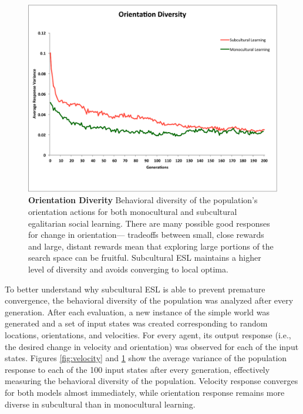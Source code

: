 \documentclass{sig-alternate}
\begin{document}
\begin{figure}
  \centering
    \includegraphics[scale=.41]{orientation_diversity.pdf}
  \caption{\textbf{Orientation Diverity} Behavioral diversity of the population's orientation actions for both monocultural and subcultural egalitarian social learning.   There are many possible good responses for change in orientation--- tradeoffs between small, close rewards and large, distant rewards mean that exploring large portions of the search space can be fruitful.  Subcultural ESL maintains a higher level of diversity and avoids converging to local optima.}
\label{fig:orientation}
\end{figure}

To better understand why subcultural ESL is able to prevent premature convergence, the behavioral diversity of the population was analyzed after every generation. After each evaluation, a new instance of the simple world was generated and a set of input states was created corresponding to random locations, orientations, and velocities. For every agent, its output response (i.e., the desired change in velocity and orientation) was observed for each of the input states. Figures \ref{fig:velocity} and \ref{fig:orientation} show the average variance of the population response to each of the 100 input states after every generation, effectively measuring the behavioral diversity of the population.  Velocity response converges for both models almost immediately, while orientation response remains more diverse in subcultural than in monocultural learning.
\end{document}
